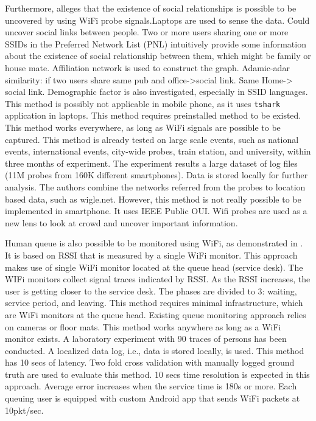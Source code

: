 Furthermore, \cite{thesis014} alleges that the existence of social relationships is possible to be uncovered by using WiFi probe signals.Laptops are used to sense the data. Could uncover social links between people. Two or more users sharing one or more SSIDs in the Preferred Network List (PNL) intuitively provide some information about the existence of social relationship between them, which might be family or house mate. Affiliation network is used to construct the graph. Adamic-adar similarity: if two users share same pub and office->social link. Same Home-> social link. Demographic factor is also investigated, especially in SSID languages. This method is possibly not applicable in mobile phone, as it uses \texttt{tshark} application in laptops. This method requires preinstalled method to be existed. This method works everywhere, as long as WiFi signals are possible to be captured. This method is already tested on large scale events, such as national events, international events, city-wide probes, train station, and university, within three months of experiment. The experiment results a large dataset of log files (11M probes from 160K different smartphones). Data is stored locally for further analysis.
The authors combine the networks referred from the probes to location based data, such as wigle.net. However, this method is not really possible to be implemented in smartphone. It uses IEEE Public OUI. Wifi probes are used as a new lens to look at crowd and uncover important information.


Human queue is also possible to be monitored using WiFi, as demonstrated in \cite{thesis012}. It is based on RSSI that is measured by a single WiFi monitor. This approach makes use of single WiFi monitor located at the queue head (service desk). The WIFi monitors collect signal traces indicated by RSSI. As the RSSI increases, the user is getting closer to the service desk. The phases are divided to 3: waiting, service period, and leaving. This method requires minimal infrastructure, which are WiFi monitors at the queue head. Existing queue monitoring approach relies on cameras or floor mats. This method works anywhere as long as a WiFi monitor exists. A laboratory experiment with 90 traces of persons has been conducted. A localized data log, i.e., data is stored locally, is used. This method has 10 secs of latency. Two fold cross validation with manually logged ground truth are used to evaluate this method. 10 secs time resolution is expected in this approach. Average error increases when the service time is 180s or more. Each queuing user is equipped with custom Android app that sends WiFi packets at 10pkt/sec.

